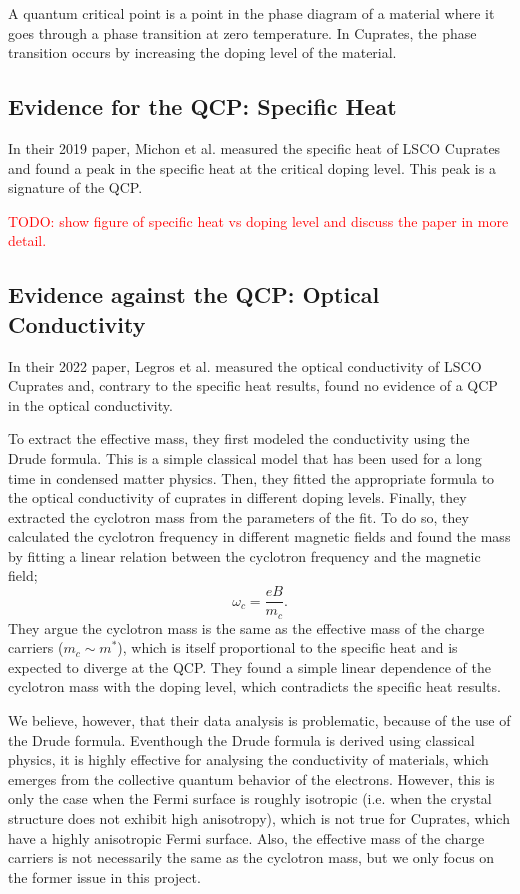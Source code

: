 \documentclass[12pt]{article}
\begin{document}
A quantum critical point is a point in the phase diagram of a material where it goes through a phase
transition at zero temperature. In Cuprates, the phase transition occurs by increasing the doping
level of the material.

\subsection{Evidence for the QCP: Specific Heat}
In their 2019 paper\cite{michon2019}, Michon et al. measured the specific heat of LSCO Cuprates
and found a peak in the specific heat at the critical doping level. This peak is a signature of
the QCP.

\textcolor{red}{TODO: show figure of specific heat vs doping level and discuss the paper in
more detail.}

\subsection{Evidence against the QCP: Optical Conductivity}
In their 2022 paper\cite{legros2022}, Legros et al. measured the optical conductivity of LSCO
Cuprates and, contrary to the specific heat results, found no evidence of a QCP in the optical
conductivity.

To extract the effective mass, they first modeled the conductivity using the Drude formula. This is
a simple classical model that has been used for a long time in condensed matter physics. Then, they
fitted the appropriate formula to the optical conductivity of cuprates in different doping levels.
Finally, they extracted the cyclotron mass from the parameters of the fit. To do so, they calculated
the cyclotron frequency in different magnetic fields and found the mass by fitting a linear relation
between the cyclotron frequency and the magnetic field;
\begin{equation}
    \omega_c = \frac{eB}{m_c}.
\end{equation}
They argue the cyclotron mass is the same as the effective mass of the charge carriers
($m_c \sim m^*$), which is itself proportional to the specific heat and is expected to diverge at
the QCP. They found a simple linear dependence of the cyclotron mass with the doping level, which
contradicts the specific heat results.

We believe, however, that their data analysis is problematic, because of the use of the Drude
formula. Eventhough the Drude formula is derived using classical physics, it is highly effective for
analysing the conductivity of materials, which emerges from the collective quantum behavior of the
electrons. However, this is only the case when the Fermi surface is roughly isotropic (i.e. when the
crystal structure does not exhibit high anisotropy), which is not true for Cuprates, which have a
highly anisotropic Fermi surface. Also, the effective mass of the charge carriers is not necessarily
the same as the cyclotron mass, but we only focus on the former issue in this project.
\end{document}
